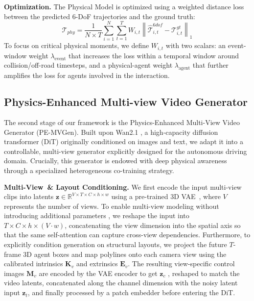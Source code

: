 \documentclass[runningheads]{llncs}
\begin{document}
\setlength{\parskip}{1pt}
\noindent \textbf{Optimization.} The Physical Model is optimized using a weighted distance loss between the predicted 6-DoF trajectories and the ground truth:
\begin{equation}
    \mathcal{T}_{phy} = \frac{1}{N \times T} \sum_{i=1}^{N} \sum_{t=1}^{T} W_{i,t} \left\| \hat{\mathcal{T}}_{i,t}^{6dof} - \mathcal{T}_{i,t}^{gt} \right\|_1
\end{equation}
To focus on critical physical moments, we define $W_{i,t}$ with two scalars: an event-window weight $\lambda_{\text{event}}$ that increases the loss within a temporal window around collision/off-road timesteps, and a physical-agent weight $\lambda_{\text{agent}}$ that further amplifies the loss for agents involved in the interaction.

\subsection{Physics-Enhanced Multi-view Video Generator}
\label{Physics-Enhanced Multi-view Video Generator}

The second stage of our framework is the Physics-Enhanced Multi-View Video Generator (PE-MVGen). Built upon Wan2.1 \cite{wan2025wan}, a high-capacity diffusion transformer (DiT) originally conditioned on images and text, we adapt it into a controllable, multi-view generator explicitly designed for the autonomous driving domain. Crucially, this generator is endowed with deep physical awareness through a specialized heterogeneous co-training strategy.

\setlength{\parskip}{1pt}
\noindent \textbf{Multi-View~\& Layout Conditioning.} We first encode the input multi-view clips into latents $\mathbf{z}\in\mathbb{R}^{V\times T\times C\times h\times w}$ using a pre-trained 3D VAE~\cite{wan2025wan}, where $V$ represents the number of views. To enable multi-view modeling without introducing additional parameters \cite{gao2025magicdrive,wen2024panacea}, we reshape the input into $ T\times C\times h \times ( V \cdot w) $, concatenating the view dimension into the spatial axis so that the same self-attention can capture cross-view dependencies. Furthermore, to explicitly condition generation on structural layouts, we project the future $T$-frame 3D agent boxes and map polylines onto each camera view using the calibrated intrinsics $\mathbf{K}_v$ and extrinsics $\mathbf{E}_v$. The resulting view-specific control images $\mathbf{M}_v$ are encoded by the VAE encoder to get $\mathbf{z}_c$ , reshaped to match the video latents, concatenated along the channel dimension with the noisy latent input $\mathbf{z}_t$, and finally processed by a patch embedder before entering the DiT.
\end{document}
